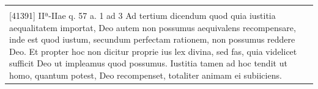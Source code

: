 \documentclass[paper=a4paper,fontsize=10pt,jafontsize=9pt,titlepage]{jlreq}
\begin{document}
\begin{longtable}{p{21em}p{21em}}
&


\\



[41391] IIª-IIae q. 57 a. 1 ad 3 Ad tertium dicendum quod quia iustitia aequalitatem importat, Deo autem non possumus aequivalens recompensare, inde est quod iustum, secundum perfectam rationem, non possumus reddere Deo. Et propter hoc non dicitur proprie ius lex divina, sed fas, quia videlicet sufficit Deo ut impleamus quod possumus. Iustitia tamen ad hoc tendit ut homo, quantum potest, Deo recompenset, totaliter animam ei subiiciens.

&



\end{longtable}
\newpage
\end{document}
